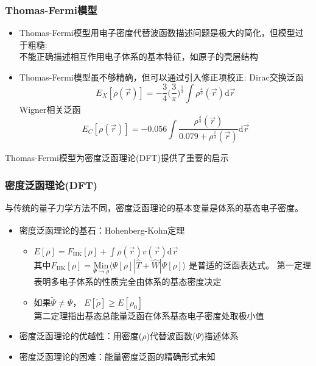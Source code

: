 \documentclass[cjk,slidestop,compress,mathserif,blue]{beamer}
\newcommand{\upcite}[1]{\hspace{0ex}\textsuperscript{\cite{#1}}} %
\begin{document}
\frame
{
	\frametitle{\textrm{Thomas-Fermi}模型}
	\begin{itemize}
		\item \textrm{Thomas-Fermi}模型用电子密度代替波函数描述问题是极大的简化，但模型过于粗糙:\\
			不能正确描述相互作用电子体系的基本特征，如原子的壳层结构
		\item \textrm{Thomas-Fermi}模型虽不够精确，但可以通过引入修正项校正:
			\textrm{Dirac}交换泛函 $$E_X[\rho(\vec r)]=-\dfrac34\bigg(\dfrac3{\pi}\bigg)^{\frac13}\int\rho^{\frac43}(\vec r)\mathrm{d}\vec r$$
			\textrm{Wigner}相关泛函 $$E_C[\rho(\vec r)]=-0.056\int\dfrac{\rho^{\frac43}(\vec r)}{0.079+\rho^{\frac13}(\vec r)}\mathrm{d}\vec r$$
	\end{itemize}
	\textrm{Thomas-Fermi}模型为密度泛函理论\textrm{(DFT)}提供了重要的启示
}

\frame                               %
{
\frametitle{密度泛函理论(\textrm{DFT})} %
与传统的量子力学方法不同，密度泛函理论的基本变量是体系的基态电子密度。%
\begin{itemize}%
	\item 密度泛函理论的基石：\textrm{Hohenberg-Kohn}定理\upcite{PR136-B864_1964}
\vskip 5pt
\begin{itemize}%
   \setlength{\itemsep}{8pt}
 \item $E[\rho]=F_{\mathrm{HK}}[\rho]+\displaystyle\int\rho(\vec{r})v(\vec{r})\textrm{d}\vec{r}$ \\
\vskip 5pt 其中$F_{\mathrm{HK}}[\rho]=\underset{\Psi\to\rho}{\mathrm{Min}}\langle\Psi[\rho]|\hat{T}+\hat{W}|\Psi[\rho]\rangle$
是普适的泛函表达式。%
     \textrm{\small{第一定理表明多电子体系的性质完全由体系的基态密度决定}}
   \item 如果$\tilde\Psi\neq\Psi$，
     $E[\tilde\rho]\geqslant E[\rho_0]$\\
     \textrm{\small{第二定理指出基态总能量泛函在体系基态电子密度处取极小值}}
   \end{itemize}
\vskip 8pt
 \item 密度泛函理论的优越性：用密度($\rho$)代替波函数($\Psi$)描述体系
\vskip 5pt
 \item 密度泛函理论的困难：能量密度泛函的精确形式未知
   \end{itemize}
}
\end{document}
